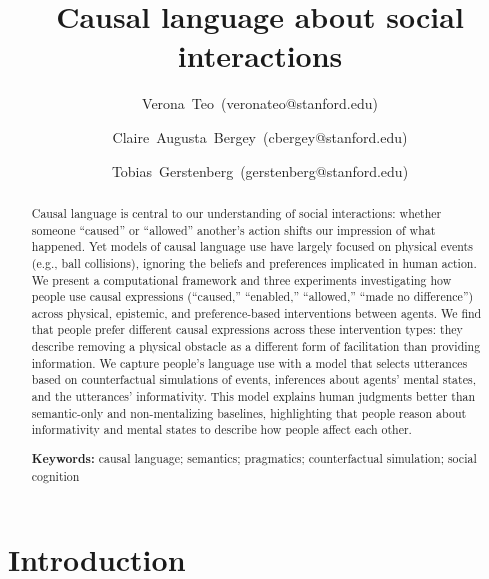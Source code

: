 \documentclass[10pt,letterpaper]{article}
\title{Causal language about social interactions}
\author[1]{\mbox{Verona Teo (veronateo@stanford.edu)}}
\author[2]{\mbox{Claire Augusta Bergey (cbergey@stanford.edu)}}
\author[1]{\mbox{Tobias Gerstenberg (gerstenberg@stanford.edu)}}
\affil[1]{Department of Psychology, Stanford University}
\affil[2]{Department of Linguistics, Stanford University}
\begin{document}
\maketitle

\begin{abstract}

Causal language is central to our understanding of social interactions: whether someone ``caused'' or ``allowed'' another's action shifts our impression of what happened.
Yet models of causal language use have largely focused on physical events (e.g., ball collisions), ignoring the beliefs and preferences implicated in human action.
We present a computational framework and three experiments investigating how people use causal expressions (``caused,'' ``enabled,'' ``allowed,'' ``made no difference'') across physical, epistemic, and preference-based interventions between agents. 
We find that people prefer different causal expressions across these intervention types: they describe removing a physical obstacle as a different form of facilitation than providing information.
We capture people's language use with a model that selects utterances based on counterfactual simulations of events, inferences about agents' mental states, and the utterances' informativity. 
This model explains human judgments better than semantic-only and non-mentalizing baselines, highlighting that people reason about informativity and mental states to describe how people affect each other. 


\textbf{Keywords:}
causal language; semantics; pragmatics; counterfactual simulation; social cognition
\end{abstract}


\section{Introduction}

\end{document}
